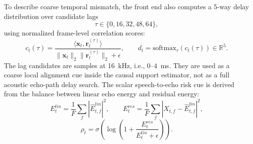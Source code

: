 \documentclass[journal]{IEEEtran}
\begin{document}
To describe coarse temporal mismatch, the front end also computes a 5-way delay distribution over candidate lags
\begin{equation}
\tau \in \{0,16,32,48,64\},
\end{equation}
using normalized frame-level correlation scores:
\begin{equation}
c_t(\tau) = \frac{\langle \mathbf{x}_t,\mathbf{r}_t^{(\tau)} \rangle}
{\|\mathbf{x}_t\|_2 \|\mathbf{r}_t^{(\tau)}\|_2 + \epsilon},
\qquad
d_t = \mathrm{softmax}_\tau(c_t(\tau)) \in \mathbb{R}^{5}.
\end{equation}
The lag candidates are samples at 16~kHz, i.e., $0$--$4$~ms. They are used as a coarse local alignment cue inside the causal support estimator, not as a full acoustic echo-path delay search.
The scalar speech-to-echo risk cue is derived from the balance between linear echo energy and residual energy:
\begin{equation}
E_t^{lin} = \frac{1}{F}\sum_f |\hat{E}_{t,f}^{lin}|^2, \qquad
E_t^{res} = \frac{1}{F}\sum_f |X_{t,f} - \hat{E}_{t,f}^{lin}|^2,
\end{equation}
\begin{equation}
\rho_t = \sigma \!\left( \log \!\left(1 + \frac{E_t^{res}}{E_t^{lin} + \epsilon}\right) \right).
\end{equation}
\end{document}
